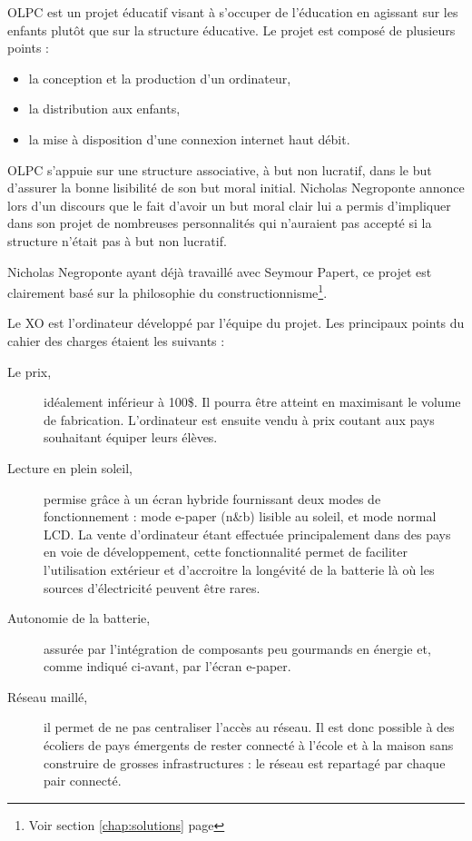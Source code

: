 \gls{OLPC} est un projet éducatif visant à s'occuper de l'éducation en agissant sur les enfants plutôt que sur la structure éducative\cite{ted_olpc_2006,ted_olpc_2008}. Le projet est composé de plusieurs points : 



\begin{itemize}
  \item la conception et la production d'un ordinateur,
  \item la distribution aux enfants,
  \item la mise à disposition d'une connexion internet haut débit.
\end{itemize}

\gls{OLPC} s'appuie sur une structure associative, à but non lucratif, dans le but d'assurer la bonne lisibilité de son but moral initial. Nicholas Negroponte annonce lors d'un discours \cite{ted_olpc_2008} que le fait d'avoir un but moral clair lui a permis d'impliquer dans son projet de nombreuses personnalités qui n'auraient pas accepté si la structure n'était pas à but non lucratif.

Nicholas Negroponte ayant déjà travaillé avec Seymour Papert, ce projet est clairement basé sur la philosophie du constructionnisme\footnote{Voir section \ref{chap:solutions} page \pageref{chap:solutions}}.

Le XO est l'ordinateur développé par l'équipe du projet. Les principaux points du cahier des charges étaient les suivants : 

\begin{description}
  \item [Le prix,] idéalement inférieur à 100\$. Il pourra être atteint en maximisant le volume de fabrication. L'ordinateur est ensuite vendu à prix coutant aux pays souhaitant équiper leurs élèves.
  \item [Lecture en plein soleil,] permise grâce à un écran hybride fournissant deux modes de fonctionnement : mode e-paper (n\&{}b) lisible au soleil, et mode normal LCD. La vente d'ordinateur étant effectuée principalement dans des pays en voie de développement, cette fonctionnalité permet de faciliter l'utilisation extérieur et d'accroitre la longévité de la batterie là où les sources d'électricité peuvent être rares.
  \item [Autonomie de la batterie,] assurée par l'intégration de composants peu gourmands en énergie et, comme indiqué ci-avant, par l'écran e-paper.
  \item [Réseau maillé,] il permet de ne pas centraliser l'accès au réseau. Il est donc possible à des écoliers de pays émergents de rester connecté à l'école et à la maison sans construire de grosses infrastructures : le réseau est repartagé par chaque pair connecté.
\end{description}

